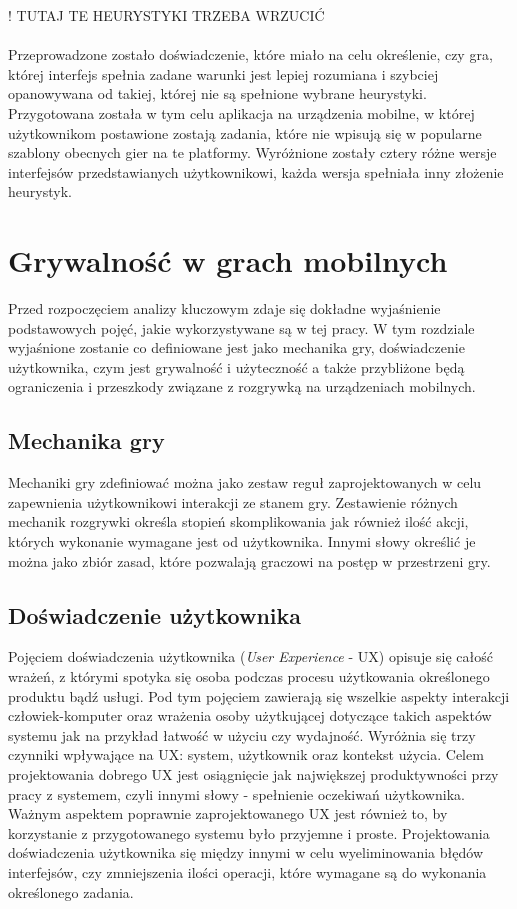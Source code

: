 \documentclass[a4paper,12pt,numbers=noenddot]{report}
\begin{document}
! TUTAJ TE HEURYSTYKI TRZEBA WRZUCIĆ\\
\\
Przeprowadzone zostało doświadczenie, które miało na celu określenie, czy gra, której interfejs spełnia zadane warunki jest lepiej rozumiana i szybciej opanowywana od takiej, której nie są spełnione wybrane heurystyki. Przygotowana została w tym celu aplikacja na urządzenia mobilne, w której użytkownikom postawione zostają zadania, które nie wpisują się w popularne szablony obecnych gier na te platformy. Wyróżnione zostały cztery różne wersje interfejsów przedstawianych użytkownikowi, każda wersja spełniała inny złożenie heurystyk.

\chapter{Grywalność w grach mobilnych}
Przed rozpoczęciem analizy kluczowym zdaje się dokładne wyjaśnienie podstawowych pojęć, jakie wykorzystywane są w tej pracy. W tym rozdziale wyjaśnione zostanie co definiowane jest jako mechanika gry, doświadczenie użytkownika, czym jest grywalność i użyteczność a także przybliżone będą ograniczenia i przeszkody związane z rozgrywką na urządzeniach mobilnych.
\section{Mechanika gry}
Mechaniki gry zdefiniować można jako zestaw reguł zaprojektowanych w celu zapewnienia użytkownikowi interakcji ze stanem gry. Zestawienie różnych mechanik rozgrywki określa stopień skomplikowania jak również ilość akcji, których wykonanie wymagane jest od użytkownika. Innymi słowy określić je można jako zbiór zasad, które pozwalają graczowi na postęp w przestrzeni gry. \cite{online_GameMechanics}

\section{Doświadczenie użytkownika}

Pojęciem doświadczenia użytkownika (\textit{User Experience} - UX) opisuje się całość wrażeń, z którymi spotyka się osoba podczas procesu użytkowania określonego produktu bądź usługi. Pod tym pojęciem zawierają się wszelkie aspekty interakcji człowiek-komputer oraz wrażenia osoby użytkującej dotyczące takich aspektów systemu jak na przykład łatwość w użyciu czy wydajność. Wyróżnia się trzy czynniki wpływające na UX: system, użytkownik oraz kontekst użycia. \cite{online_UXDef}
Celem projektowania dobrego UX jest osiągnięcie jak największej produktywności przy pracy z systemem, czyli innymi słowy - spełnienie oczekiwań użytkownika. Ważnym aspektem poprawnie zaprojektowanego UX jest również to, by korzystanie z przygotowanego systemu było przyjemne i proste. Projektowania doświadczenia użytkownika się między innymi w celu wyeliminowania błędów interfejsów, czy zmniejszenia ilości operacji, które wymagane są do wykonania określonego zadania.
\cite{art_UserExperience}
\end{document}
